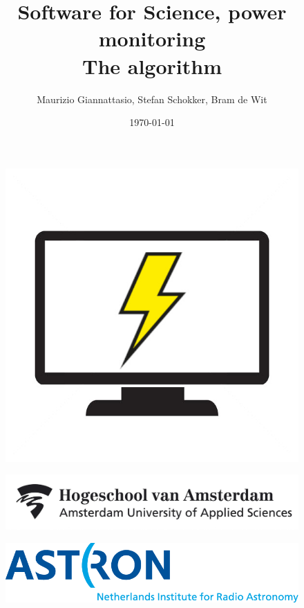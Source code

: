 \documentclass[11pt, A4, oneside]{article}
\title{Software for Science, power monitoring \\ The algorithm \\}
\author{Maurizio Giannattasio, Stefan Schokker, Bram de Wit}
\date{\today}
\begin{document}
\begin{titlepage}
	\maketitle
	
	\begin{figure}[htbp]
		\centering
		\includegraphics{PowerMonitoring_logo}
	\end{figure}	
	\begin{figure}[htbp]
	\centering
	\includegraphics[scale=0.15]{Logo-hva}
    \end{figure}
	\begin{figure}[htbp]
		\centering
		\includegraphics{Logo-astron}
	\end{figure}

\end{titlepage}
\end{document}
